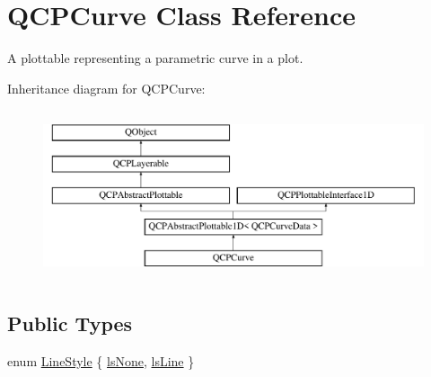 \hypertarget{class_q_c_p_curve}{}\section{Q\+C\+P\+Curve Class Reference}
\label{class_q_c_p_curve}


A plottable representing a parametric curve in a plot.  


Inheritance diagram for Q\+C\+P\+Curve\+:\begin{figure}[H]
\begin{center}
\leavevmode
\includegraphics[height=5.000000cm]{class_q_c_p_curve}
\end{center}
\end{figure}
\subsection*{Public Types}
\begin{DoxyCompactItemize}
\item 
enum \hyperlink{class_q_c_p_curve_a2710e9f79302152cff794c6e16cc01f1}{Line\+Style} \{ \hyperlink{class_q_c_p_curve_a2710e9f79302152cff794c6e16cc01f1aec1601a191cdf0b4e761c4c66092cc48}{ls\+None}, 
\hyperlink{class_q_c_p_curve_a2710e9f79302152cff794c6e16cc01f1ade5822ce6fbf131d3df131795c2e1003}{ls\+Line}
 \}
\end{DoxyCompactItemize}

